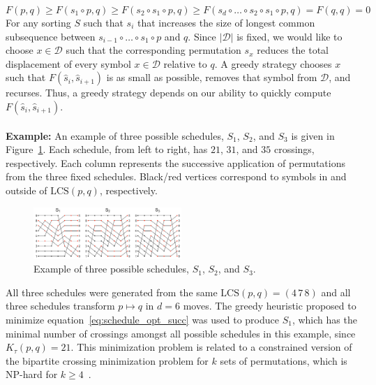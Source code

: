 \documentclass{siamart190516}
\begin{document}
$$ F(p, q) \geq F(s_1 \circ p, q) \geq F( s_2 \circ s_1 \circ p, q) \geq F( s_d \circ \dots \circ s_2 \circ s_1 \circ p, q)  = F(q,q) = 0 $$
For any sorting $S$ such that $s_{i}$ that increases the size of longest common subsequence between $s_{i-1} \circ \dots \circ s_1 \circ p$ and $q$. Since $\lvert \mathcal{D} \rvert$ is fixed, we would like to choose $x \in \mathcal{D}$ such that the corresponding permutation $s_x$ reduces the total displacement of every symbol $x \in \mathcal{D}$ relative to  $q$. A greedy strategy chooses $x$ such that $F(\hat{s}_i, \hat{s}_{i+1})$ is as small as possible, removes that symbol from $\mathcal{D}$, and recurses. Thus, a greedy strategy depends on our ability to quickly compute $F(\hat{s}_i, \hat{s}_{i+1})$. 
\\
\\
\noindent \textbf{Example:} An example of three possible schedules, $S_1$, $S_2$, and $S_3$ is given in Figure~\ref{fig:crossings}. Each schedule, from left to right, has $21$, $31$, and $35$ crossings, respectively. Each column represents the successive application of permutations from the three fixed schedules. Black/red vertices correspond to symbols in and outside of $\mathrm{LCS}(p,q)$, respectively. 
\begin{figure}[ht]
    \centering
    \includegraphics[width=0.50\textwidth]{crossings.png}
    \caption{Example of three possible schedules, $S_1$, $S_2$, and $S_3$.}
    \label{fig:crossings}
\end{figure}
All three schedules were generated from the same $\mathrm{LCS}(p,q) = (4\,7\,8)$ and all three schedules transform $p \mapsto q$ in $d = 6$ moves. The greedy heuristic proposed to minimize equation~\ref{eq:schedule_opt_succ} was used to produce $S_1$, which has the minimal number of crossings amongst all possible schedules in this example, since $K_\tau(p,q) = 21$. This minimization problem is related to a constrained version of the bipartite crossing minimization problem for $k$ sets of permutations, which is NP-hard for $k \geq 4$~\cite{biedl2009complexity}.
\end{document}
